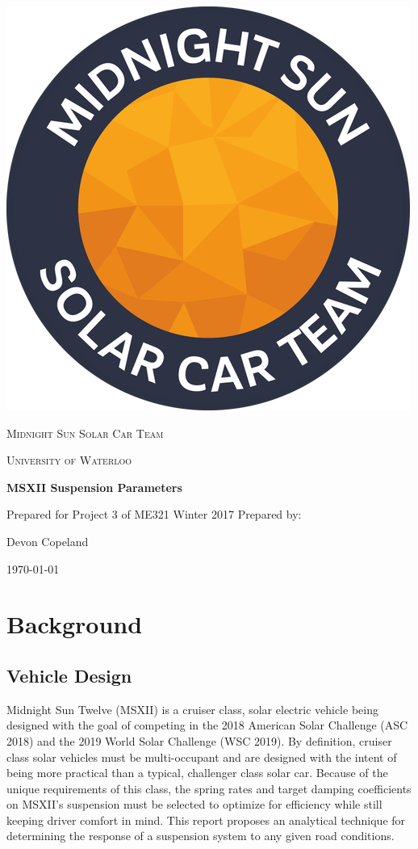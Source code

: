 \documentclass[12pt]{article}
\begin{document}
\begin{titlepage}
	\vspace*{3cm}
	\centering
	\includegraphics[width=.25\textwidth]{./LaTex/midnightSunLogoCircle.png}\par
	\vspace{1.5cm}
	{\scshape\LARGE Midnight Sun Solar Car Team \par}
	{\scshape\large University of Waterloo\par}
	\vspace{3.5cm}
	{\huge\bfseries MSXII Suspension Parameters\par}
	\vspace{0.2cm}
	\large Prepared for Project 3 of ME321 Winter 2017
	\vfill
	Prepared by:\par
	Devon Copeland\par
	\vspace{1cm}
	\today\par
\end{titlepage}

\section{Background}
\subsection{Vehicle Design}
Midnight Sun Twelve (MSXII) is a cruiser class, solar electric vehicle being designed with the goal of competing in the 2018 American Solar Challenge (ASC 2018) and the 2019 World Solar Challenge (WSC 2019). By definition, cruiser class solar vehicles must be multi-occupant and are designed with the intent of being more practical than a typical, challenger class solar car. Because of the unique requirements of this class, the spring rates and target damping coefficients on MSXII's suspension must be selected to optimize for efficiency while still keeping driver comfort in mind. This report proposes an analytical technique for determining the response of a suspension system to any given road conditions. 
\end{document}
